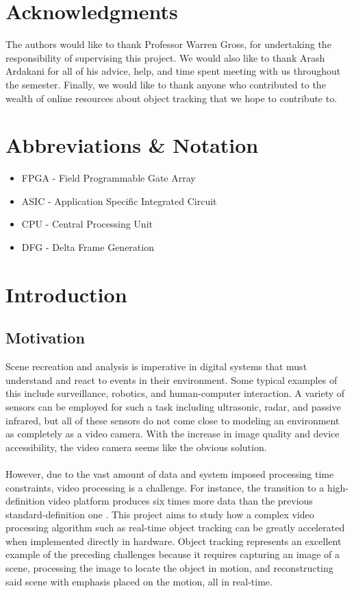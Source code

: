 \documentclass[12pt]{article} %
\begin{document}
\section*{Acknowledgments}
The authors would like to thank Professor Warren Gross, for undertaking the responsibility of supervising this project. We would also like to thank Arash Ardakani for all of his advice, help, and time spent meeting with us throughout the semester. Finally, we would like to thank anyone who contributed to the wealth of online resources about object tracking that we hope to contribute to.
\pagebreak
\tableofcontents
\pagebreak
\section{Abbreviations \& Notation}
\begin{itemize}
\item[] FPGA - Field Programmable Gate Array
\item[] ASIC - Application Specific Integrated Circuit
\item[] CPU - Central Processing Unit
\item[] DFG - Delta Frame Generation
\end{itemize}
\section{Introduction}
\subsection{Motivation}
Scene recreation and analysis is imperative in digital systems that must understand and react to events in their environment. Some typical examples of this include surveillance, robotics, and human-computer interaction. A variety of sensors can be employed for such a task including ultrasonic, radar, and passive infrared, but all of these sensors do not come close to modeling an environment as completely as a video camera. With the increase in image quality and device accessibility, the video camera seems like the obvious solution. \\\\
However, due to the vast amount of data and system imposed processing time constraints, video processing is a challenge. For instance, the transition to a high-definition video platform produces six times more data than the previous standard-definition one \cite{3}. This project aims to study how a complex video processing algorithm such as real-time object tracking can be greatly accelerated when implemented directly in hardware. Object tracking represents an excellent example of the preceding challenges because it requires capturing an image of a scene, processing the image to locate the object in motion, and reconstructing said scene with emphasis placed on the motion, all in real-time.
\end{document}
